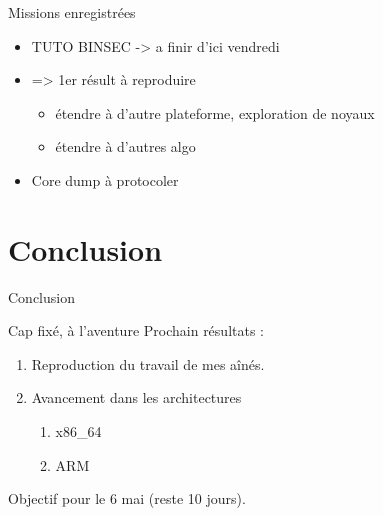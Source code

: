 \documentclass[A4,svgnames,9pt,aspectratio=169]{beamer}
\begin{document}

\begin{frame}{Missions enregistrées}
  \begin{itemize}
    \item TUTO BINSEC -> a finir d'ici vendredi
    \item => 1er résult à reproduire
    \begin{itemize}
      \item étendre à d'autre plateforme, exploration de noyaux
      \item étendre à d'autres algo
    \end{itemize}
    
    \item Core dump à protocoler
  \end{itemize}
\end{frame}


\section{Conclusion}
\begin{frame}{Conclusion}

    \begin{block}{Cap fixé, à l'aventure}
      Prochain résultats :
      \begin{enumerate}
        \item Reproduction du travail de mes aînés.
        \item Avancement dans les architectures
        \begin{enumerate}
          \item x86\_64
          \item ARM 
        \end{enumerate}
      \end{enumerate}
    Objectif pour le 6 mai (reste 10 jours).
    \end{block}

\end{frame}


\frame{\merci}
\end{document}
